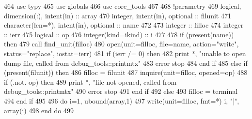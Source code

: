 \begin{DoxyCode}
464       \textcolor{keywordtype}{use }typy
465       \textcolor{keywordtype}{use }globals
466       \textcolor{keywordtype}{use }core_tools
467       
468       \textcolor{comment}{!parametry}
469       \textcolor{keywordtype}{logical}, \textcolor{keywordtype}{dimension(:)}, \textcolor{keywordtype}{intent(in)} :: array
470       \textcolor{keywordtype}{integer}, \textcolor{keywordtype}{intent(in)}, \textcolor{keywordtype}{optional} :: filunit   
471       \textcolor{keywordtype}{character(len=*)}, \textcolor{keywordtype}{intent(in)}, \textcolor{keywordtype}{optional} :: name
472 
473       \textcolor{keywordtype}{integer} :: filloc
474       \textcolor{keywordtype}{integer} :: ierr
475       \textcolor{keywordtype}{logical} :: op
476       \textcolor{keywordtype}{integer(kind=ikind)} :: i
477       
478       \textcolor{keywordflow}{if} (\textcolor{keyword}{present}(name)) \textcolor{keywordflow}{then}
479         \textcolor{keyword}{call }find_unit(filloc)
480         \textcolor{keyword}{open}(unit=filloc, file=name, action=\textcolor{stringliteral}{"write"}, status=\textcolor{stringliteral}{"replace"}, iostat\textcolor{comment}{=ierr)}
481 \textcolor{comment}{        }\textcolor{keywordflow}{if} (ierr /= 0) \textcolor{keywordflow}{then}
482           print *, \textcolor{stringliteral}{"unable to open dump file, called from debug\_tools::printmtx"}
483           error stop
484 \textcolor{keywordflow}{        end if}
485       \textcolor{keywordflow}{else} \textcolor{keywordflow}{if} (\textcolor{keyword}{present}(filunit)) \textcolor{keywordflow}{then}
486         filloc = filunit
487         \textcolor{keyword}{inquire}(unit=filloc, opened=op)
488         \textcolor{keywordflow}{if} (.not. op) \textcolor{keywordflow}{then}
489           print *, \textcolor{stringliteral}{"file not opened, called from debug\_tools::printmtx"}
490           error stop
491 \textcolor{keywordflow}{        end if}
492       \textcolor{keywordflow}{else}
493         filloc = terminal
494 \textcolor{keywordflow}{      end if}
495       
496       \textcolor{keywordflow}{do} i=1, ubound(array,1)
497         \textcolor{keyword}{write}(unit=filloc, fmt=*) i, \textcolor{stringliteral}{"|"}, array(i)
498 \textcolor{keywordflow}{      end do}
499       
\end{DoxyCode}
